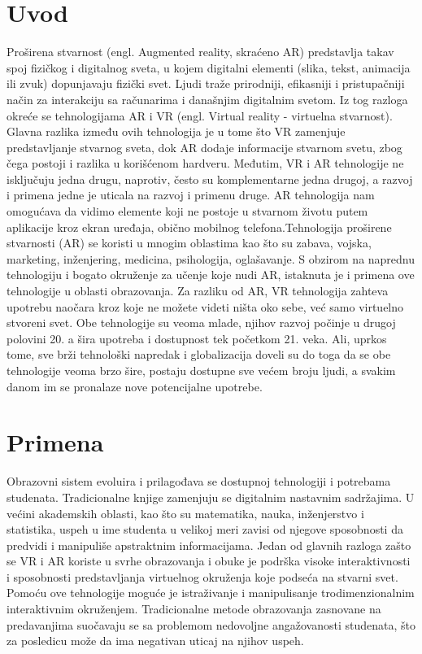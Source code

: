 \documentclass[a4paper]{article}
\begin{document}
	\section{Uvod}
	\label{sec:Uvod}
	Proširena stvarnost (engl. Augmented reality, skraćeno AR) predstavlja takav spoj fizičkog i digitalnog sveta, u kojem digitalni elementi (slika, tekst, 
	animacija ili zvuk) dopunjavaju fizički svet. Ljudi traže prirodniji, efikasniji i pristupačniji način za interakciju sa računarima i današnjim digitalnim 
	svetom. Iz tog razloga okreće se tehnologijama AR i VR (engl. Virtual reality - virtuelna stvarnost). Glavna razlika između ovih tehnologija je u tome što VR 
	zamenjuje predstavljanje stvarnog sveta, dok AR dodaje informacije stvarnom svetu, zbog čega postoji i razlika u korišćenom hardveru. Međutim, VR i AR 
	tehnologije ne isključuju jedna drugu, naprotiv, često su komplementarne jedna drugoj, a razvoj i primena jedne je uticala na razvoj i primenu druge. AR 
	tehnologija nam omogućava da vidimo elemente koji ne postoje u stvarnom životu putem aplikacije kroz ekran uređaja, obično mobilnog telefona.Tehnologija 
	proširene stvarnosti (AR) se koristi u mnogim oblastima kao što su zabava, vojska, marketing, inženjering, medicina, psihologija, oglašavanje. S obzirom na 
	naprednu tehnologiju i bogato okruženje za učenje koje nudi AR, istaknuta je i primena ove tehnologije u oblasti obrazovanja. Za razliku od AR, VR tehnologija 
	zahteva upotrebu naočara kroz koje ne možete videti ništa oko sebe, već samo virtuelno stvoreni svet. Obe tehnologije su veoma mlade, njihov razvoj počinje u 
	drugoj polovini 20. a šira upotreba i dostupnost tek početkom 21. veka. Ali, uprkos tome, sve brži tehnološki napredak i globalizacija doveli su do toga da se 
	obe tehnologije veoma brzo šire, postaju dostupne sve većem broju ljudi, a svakim danom im se pronalaze nove potencijalne upotrebe.
	
	\section{Primena}
	\label{sec:Primena}
	Obrazovni sistem evoluira i prilagođava se dostupnoj tehnologiji i potrebama studenata. Tradicionalne knjige zamenjuju se digitalnim nastavnim sadržajima. 
	U većini akademskih oblasti, kao što su matematika, nauka, inženjerstvo i statistika, uspeh u ime studenta u velikoj meri zavisi od njegove sposobnosti da 
	predvidi i manipuliše apstraktnim informacijama. Jedan od glavnih razloga zašto se VR i AR koriste u svrhe obrazovanja i obuke je podrška visoke interaktivnosti 
	i sposobnosti predstavljanja virtuelnog okruženja koje podseća na stvarni svet. Pomoću ove tehnologije moguće je istraživanje i manipulisanje trodimenzionalnim 
	interaktivnim okruženjem. Tradicionalne metode obrazovanja zasnovane na predavanjima suočavaju se sa problemom nedovoljne  angažovanosti studenata, što za posledicu 
	može da ima negativan uticaj na njihov uspeh.
\end{document}
